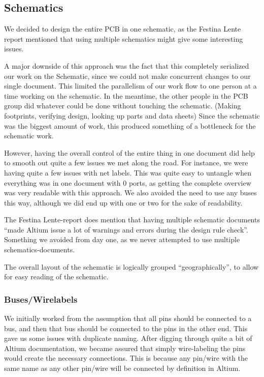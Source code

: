 \subsection {Schematics}

We decided to design the entire \ac{PCB} in one schematic, as the Festina Lente
report mentioned that using multiple schematics might give
some interesting issues.

A major downside of this approach was the fact that this completely serialized
our work on the Schematic, since we could not make concurrent changes to our
single document. This limited the parallelism of our work flow to one person at a
time working on the schematic.  In the meantime, the other people in the
\ac{PCB} group did whatever could be done without touching the
schematic. (Making footprints, verifying design, looking up parts and data
sheets) Since the schematic was the biggest amount of work, this produced
something of a bottleneck for the schematic work.

However, having the overall control of the entire thing in one document
did help to smooth out quite a few issues we met along the road. For instance,
we were having quite a few issues with net labels. This was quite easy to
untangle when everything was in one document with 0 ports, as getting the
complete overview was very readable with this approach. We also avoided the need
to use any buses this way, although we did end up with one or two for the sake
of readability.

  The
Festina Lente-report does mention that having multiple schematic documents
``made Altium issue a lot of warnings and errors during the design rule
check''\cite[p.~49]{berg2011festinalente}. Something we avoided from day one, as
we never attempted to use multiple schematics-documents. 

The overall layout of the schematic is logically grouped ``geographically'', to
allow for easy reading of the schematic.

\subsubsection {Buses/Wirelabels}
We initially worked from the assumption that all pins should be connected to a
bus, and then that bus should be connected to the pins in the other end. This
gave us some issues with duplicate naming. After digging through quite a bit of
Altium documentation, we became assured that simply wire-labeling the pins
would create the necessary connections. This is because any pin/wire with the
same name as any other pin/wire will be connected by definition in Altium.

